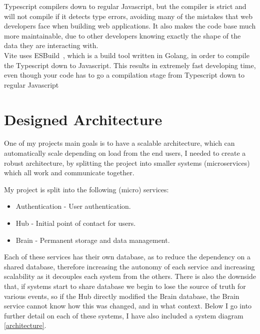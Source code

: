 \documentclass[titlepage]{article}
\begin{document}
Typescript compilers down to regular Javascript, but the compiler is strict and will not compile if it detects type errors, avoiding many of the mistakes that web developers face when building web applications. It also makes the code base much more maintainable, due to other developers knowing exactly the shape of the data they are interacting with. \\

Vite uses ESBuild~\cite{esbuild}, which is a build tool written in Golang, in order to compile the Typescript down to Javascript. This results in extremely fast developing time, even though your code has to go a compilation stage from Typescript down to regular Javascript \\

\pagebreak
\section{Designed Architecture}
One of my projects main goals is to have a scalable architecture, which can automatically scale depending on load from the end users, I needed to create a robust architecture, by splitting the project into smaller systems (microservices) which all work and communicate together.

My project is split into the following (micro) services:
\begin{itemize}
  \item Authentication - User authentication.
  \item Hub - Initial point of contact for users.
  \item Brain - Permanent storage and data management.
\end{itemize}

Each of these services has their own database, as to reduce the dependency on a shared database, therefore increasing the autonomy of each service and increasing scalability as it decouples each system from the others. There is also the downside that, if systems start to share database we begin to lose the source of truth for various events, so if the Hub directly modified the Brain database, the Brain service cannot know how this was changed, and in what context. Below I go into further detail on each of these systems, I have also included a system diagram \ref{architecture}.
\end{document}

